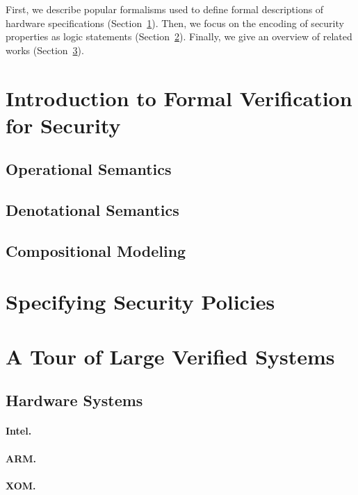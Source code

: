 \documentclass[oneside,a4paper]{memoir}
\begin{document}
First, we describe popular formalisms used to define formal descriptions of
hardware specifications (Section~\ref{sec:sota:formalisms}).
%
Then, we focus on the encoding of security properties as logic statements
(Section~\ref{sec:sota:security}).
%
Finally, we give an overview of related works
(Section~\ref{sec:sota:relatedwork}).

\section{Introduction to Formal Verification for Security}
\label{sec:sota:formalisms}

\subsection{Operational Semantics}

\subsection{Denotational Semantics}

\subsection{Compositional Modeling}

\section{Specifying Security Policies}
\label{sec:sota:security}

\section{A Tour of Large Verified Systems}
\label{sec:sota:relatedwork}

\subsection{Hardware Systems}

\paragraph{Intel.}

\paragraph{ARM.}

\paragraph{XOM.}

%

\end{document}
